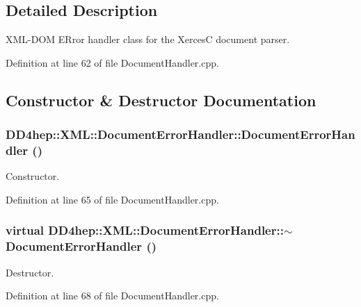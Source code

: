 \subsection{Detailed Description}
XML-\/DOM ERror handler class for the XercesC document parser. 

Definition at line 62 of file DocumentHandler.cpp.

\subsection{Constructor \& Destructor Documentation}
\hypertarget{class_d_d4hep_1_1_x_m_l_1_1_document_error_handler_aa887197fc5ae8d3a7463307a36dad8b2}{
\subsubsection[{DocumentErrorHandler}]{\setlength{\rightskip}{0pt plus 5cm}DD4hep::XML::DocumentErrorHandler::DocumentErrorHandler ()}}
\label{class_d_d4hep_1_1_x_m_l_1_1_document_error_handler_aa887197fc5ae8d3a7463307a36dad8b2}


Constructor. 

Definition at line 65 of file DocumentHandler.cpp.\hypertarget{class_d_d4hep_1_1_x_m_l_1_1_document_error_handler_a2444e9636a7fe532b865aab9e7b3c676}{
\subsubsection[{$\sim$DocumentErrorHandler}]{\setlength{\rightskip}{0pt plus 5cm}virtual DD4hep::XML::DocumentErrorHandler::$\sim$DocumentErrorHandler ()}}
\label{class_d_d4hep_1_1_x_m_l_1_1_document_error_handler_a2444e9636a7fe532b865aab9e7b3c676}


Destructor. 

Definition at line 68 of file DocumentHandler.cpp.

